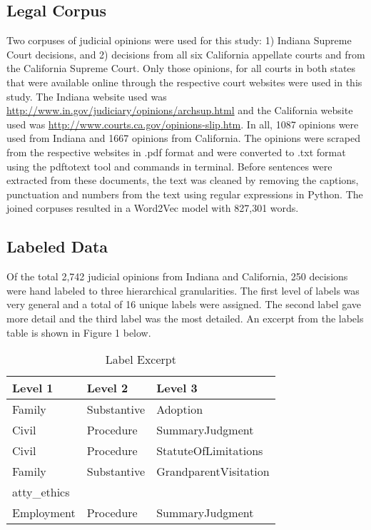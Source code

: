 \documentclass[11pt]{article}
\begin{document}
\subsection{Legal Corpus}
Two corpuses of judicial opinions were used for this study: 1) Indiana Supreme Court decisions, and 2) decisions from all six California appellate courts and from the California Supreme Court.  Only those opinions, for all courts in both states that were available online through the respective court websites were used in this study.  The Indiana website used was \url{http://www.in.gov/judiciary/opinions/archsup.html}  and the California website used was \url{http://www.courts.ca.gov/opinions-slip.htm}.  In all, 1087 opinions were used from Indiana and 1667 opinions from California.  The opinions were scraped from the respective websites in .pdf format and were converted to .txt format using the pdftotext tool and commands in terminal.  Before sentences were extracted from these documents, the text was cleaned by removing the captions, punctuation and numbers from the text using regular expressions in Python.  The joined corpuses resulted in a Word2Vec model with 827,301 words.  

\subsection{Labeled Data}
Of the total 2,742 judicial opinions from Indiana and California, 250 decisions were hand labeled to three hierarchical granularities.  The first level of labels was very general and a total of 16 unique labels were assigned.  The second label gave more detail and the third label was the most detailed.  An excerpt from the labels table is shown in Figure 1 below.

\begin{table}
\small
\begin{center}
\begin{tabular}{|l|l|l|}
\hline 
\bf Level 1 & \bf Level 2 & \bf Level 3 \\ 
\hline
Family & Substantive & Adoption \\
\hline
Civil & Procedure & SummaryJudgment \\
\hline
Civil & Procedure & StatuteOfLimitations \\
\hline
Family & Substantive & GrandparentVisitation \\
\hline
atty\_ethics &  &   \\
\hline
Employment & Procedure  & SummaryJudgment\\
\hline
\end{tabular}
\caption{\label{label-table} Label Excerpt }
\end{center}
\end{table}  
\end{document}
